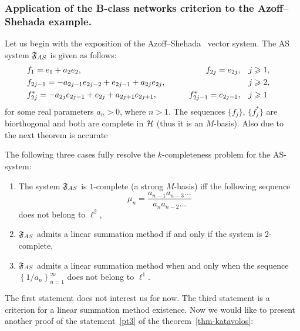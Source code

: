 \documentclass[12pt]{article}
\begin{document}
    \subsubsection{Application of the B-class networks criterion to the Azoff--Shehada example.}
      Let us begin with the exposition of the Azoff--Shehada~\cite{azoff} vector system.
      The AS system $\fsys_{AS}$ is given as follows:
      \begin{equation}
        \label{as-system}
        \begin{aligned}
          &f_1 = e_1 + a_2 e_2, \qquad &f_{2j}=e_{2j}, \quad&j \geq 1,&\\
          &f_{2j-1}=-a_{2j-1}e_{2j-2} + e_{2j-1} + a_{2j}e_{2j}, \qquad &\makebox[5em]{} \quad&j \geq 2,&\\
          &f^*_{2j}=-a_{2j}e_{2j-1}+e_{2j}+a_{2j+1}e_{2j+1}, \qquad &f^*_{2j-1}=e_{2j-1}, \quad&j \geq 1&
        \end{aligned}
      \end{equation}
        for some real parameters $a_n > 0$, where $n > 1$.
      The sequences $\{f_j\}$, $\{f^*_j\}$ are biorthogonal and both are complete in $\cal{H}$ (thus it is an $M$-basis).
      Also due to~\cite{katavolos} the next theorem is accurate
      \begin{theorem}
        \label{thm-katavolos}
        The following three cases fully resolve the $k$-completeness problem for the AS-system:
        \begin{enumerate}[label=(\alph*)]
          \item The system $\fsys_{AS}$ is $1$-complete (a strong $M$-basis) iff the following sequence
            \begin{equation*}
              \mu_n = \frac{a_{n-1} a_{n-3} \dots}{a_{n} a_{n-2} \dots }
            \end{equation*}
              does not belong to $\ell^2$,
          \item \label{pt2} $\fsys_{AS}$ admits a linear summation method if and only if the system is $2$-complete,
          \item \label{pt3} $\fsys_{AS}$ admits a linear summation method when and only when
            the sequence $\left\{1/a_n\right\}_{n=1}^\infty$ does not belong to $\ell^1$.
        \end{enumerate}
      \end{theorem}
      The first statement does not interest us for now.
      The third statement is a criterion for a linear summation method existence.
      Now we would like to present another proof of the statement~\ref{pt3} of the theorem~\ref{thm-katavolos}:
\end{document}
